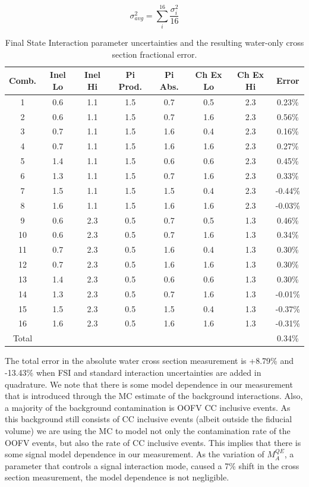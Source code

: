 \begin{equation}
\sigma_{avg}^2 = \sum_i^{16} \frac{\sigma_i^2}{16}
\end{equation}

\begin{table}[h]
\caption{Final State Interaction parameter uncertainties and the resulting water-only cross section fractional error.}
\centering
\begin{tabular}{cccccccc}\toprule\midrule
\renewcommand{\arraystretch}{1.1}
Comb.& Inel Lo & Inel Hi & Pi Prod. & Pi Abs. & Ch Ex Lo & Ch Ex Hi & Error
\\ \midrule
1 & 0.6 & 1.1 & 1.5 & 0.7 & 0.5 & 2.3 & 0.23\%\\
\midrule
2 & 0.6 & 1.1 & 1.5 & 0.7 & 1.6 & 2.3 & 0.56\%\\
\midrule
3 & 0.7 & 1.1 & 1.5 & 1.6 & 0.4 & 2.3 & 0.16\%\\
\midrule
4 & 0.7 & 1.1 & 1.5 & 1.6 & 1.6 & 2.3 & 0.27\%\\
\midrule
5 & 1.4 & 1.1 & 1.5 & 0.6 & 0.6 & 2.3 & 0.45\%\\
\midrule
6 & 1.3 & 1.1 & 1.5 & 0.7 & 1.6 & 2.3 & 0.33\%\\
\midrule
7 & 1.5 & 1.1 & 1.5 & 1.5 & 0.4 & 2.3 & -0.44\%\\
\midrule
8 & 1.6 & 1.1 & 1.5 & 1.6 & 1.6 & 2.3 & -0.03\%\\
\midrule
9 & 0.6 & 2.3 & 0.5 & 0.7 & 0.5 & 1.3 & 0.46\%\\
\midrule
10 & 0.6 & 2.3 & 0.5 & 0.7 & 1.6 & 1.3 & 0.34\%\\
\midrule
11 & 0.7 & 2.3 & 0.5 & 1.6 & 0.4 & 1.3 & 0.30\%\\
\midrule
12 & 0.7 & 2.3 & 0.5 & 1.6 & 1.6 & 1.3 & 0.30\%\\
\midrule
13 & 1.4 & 2.3 & 0.5 & 0.6 & 0.6 & 1.3 & 0.30\%\\
\midrule
14 & 1.3 & 2.3 & 0.5 & 0.7 & 1.6 & 1.3 & -0.01\%\\
\midrule
15 & 1.5 & 2.3 & 0.5 & 1.5 & 0.4 & 1.3 & -0.37\%\\
\midrule
16 & 1.6 & 2.3 & 0.5 & 1.6 & 1.6 & 1.3 & -0.31\%\\
\midrule
Total & & & & & & & 0.34\%\\
\midrule
\bottomrule
\end{tabular}
\label{tab:XSecFSI}
\end{table}

The total error in the absolute water cross section measurement is +8.79\% and -13.43\% when FSI and standard interaction uncertainties are added in quadrature. We note that there is some model dependence in our measurement that is introduced through the MC estimate of the background interactions. Also, a majority of the background contamination is OOFV CC inclusive events. As this background still consists of CC inclusive events (albeit outside the fiducial volume) we are using the MC to model not only the contamination rate of the OOFV events, but also the rate of CC inclusive events. This implies that there is some signal model dependence in our measurement. As the variation of $M_A^{QE}$, a parameter that controls a signal interaction mode, caused a 7\% shift in the cross section measurement, the model dependence is not negligible.

\newpage